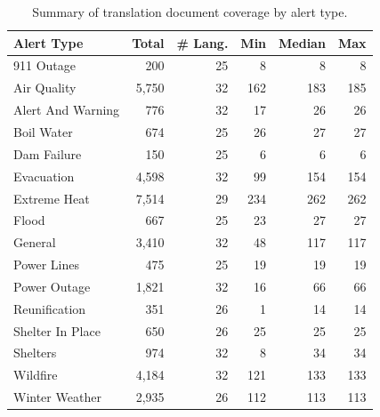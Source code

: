 \begin{table}
\centering
\setlength{\tabcolsep}{3pt}
\renewcommand{\arraystretch}{0.95}
\begin{tabular}{lrrrrr}
\toprule
\textbf{Alert Type} & \textbf{Total} & \textbf{\# Lang.} & \textbf{Min} & \textbf{Median} & \textbf{Max} \\
\midrule
911 Outage & 200 & 25 & 8 & 8 & 8 \\
Air Quality & 5,750 & 32 & 162 & 183 & 185 \\
Alert And Warning & 776 & 32 & 17 & 26 & 26 \\
Boil Water & 674 & 25 & 26 & 27 & 27 \\
Dam Failure & 150 & 25 & 6 & 6 & 6 \\
Evacuation & 4,598 & 32 & 99 & 154 & 154 \\
Extreme Heat & 7,514 & 29 & 234 & 262 & 262 \\
Flood & 667 & 25 & 23 & 27 & 27 \\
General & 3,410 & 32 & 48 & 117 & 117 \\
Power Lines & 475 & 25 & 19 & 19 & 19 \\
Power Outage & 1,821 & 32 & 16 & 66 & 66 \\
Reunification & 351 & 26 & 1 & 14 & 14 \\
Shelter In Place & 650 & 26 & 25 & 25 & 25 \\
Shelters & 974 & 32 & 8 & 34 & 34 \\
Wildfire & 4,184 & 32 & 121 & 133 & 133 \\
Winter Weather & 2,935 & 26 & 112 & 113 & 113 \\
\bottomrule
\end{tabular}
\caption{Summary of translation document coverage by alert type.}
\label{tab:portland_translations_per_alert_lang_summary}
\end{table}